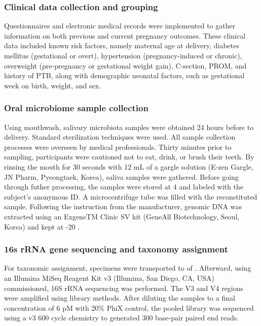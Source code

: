 \documentclass[11pt, a4paper, onecolumn, oneside]{report}
\begin{document}
            \subsubsection{Clinical data collection and grouping}
                Questionnaires and electronic medical records were implemented to gather information on both previous and current pregnancy outcomes. These clinical data included known risk factors, namely maternal age at delivery, diabetes mellitus (gestational or overt), hypertension (pregnancy-induced or chronic), overweight (pre-pregnancy or gestational weight gain), C-section, PROM, and history of PTB, along with demographic neonatal factors, such as gestational week on birth, weight, and sex.

            \subsubsection{Oral microbiome sample collection}
                Using mouthwash, salivary microbiota samples were obtained 24 hours before to delivery. Standard sterilization techniques were used. All sample collection processes were overseen by medical professionals. Thirty minutes prior to sampling, participants were cautioned not to eat, drink, or brush their teeth. By rinsing the mouth for 30 seconds with 12 mL of a gargle solution (E-zen Gargle, JN Pharm, Pyeongtaek, Korea), saliva samples were gathered. Before going through futher processing, the samples were stored at 4 \textcelsius and labeled with the subject's anonymous ID. A microcentrifuge tube was filled with the reconstituted sample. Following the instruction from the manufacturer, genomic DNA was extracted using an ExgeneTM Clinic SV kit (GeneAll Biotechnology, Seoul, Korea) and kept at -20 \textcelsius.

            \subsubsection{16s rRNA gene sequencing and taxonomy assignment}
                For taxonomic assignment, specimens were transported to  of . Afterward, using an Illumina MiSeq Reagent Kit v3 (Illumina, San Diego, CA, USA) commissioned, 16S rRNA sequencing was performed. The V3 and V4 regions were amplified using library methods. After diluting the samples to a final concentration of 6 pM with 20\% PhiX control, the pooled library was sequenced using a v3 600 cycle chemistry to generated 300 base-pair paired end reads.
\end{document}
